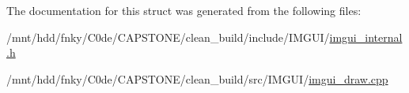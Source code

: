 The documentation for this struct was generated from the following files\+:\begin{DoxyCompactItemize}
\item 
/mnt/hdd/fnky/\+C0de/\+C\+A\+P\+S\+T\+O\+N\+E/clean\+\_\+build/include/\+I\+M\+G\+U\+I/\hyperlink{imgui__internal_8h}{imgui\+\_\+internal.\+h}\item 
/mnt/hdd/fnky/\+C0de/\+C\+A\+P\+S\+T\+O\+N\+E/clean\+\_\+build/src/\+I\+M\+G\+U\+I/\hyperlink{imgui__draw_8cpp}{imgui\+\_\+draw.\+cpp}\end{DoxyCompactItemize}

